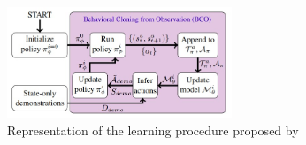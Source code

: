 \begin{figure}[tb]
    \centering
    \includegraphics[width=0.6\textwidth]{figures/images/bco/bco.jpg}
    \caption{Representation of the learning procedure proposed by~\cite{torabi2018bco}}
    \label{fig:bco}
\end{figure}
